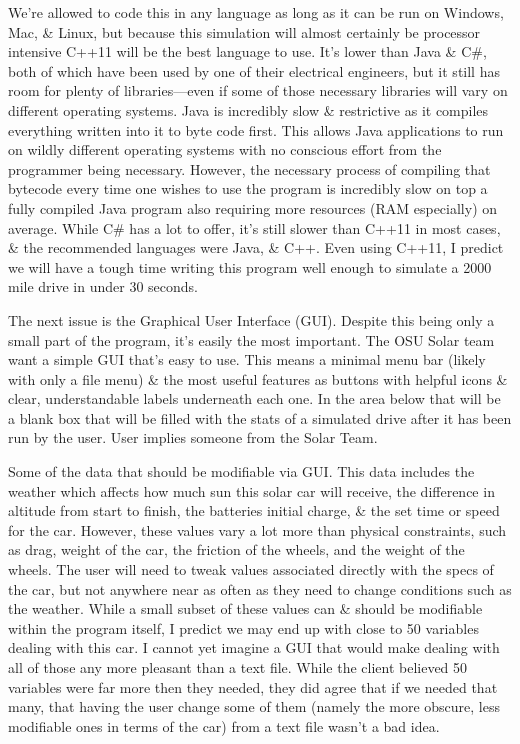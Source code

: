 \documentclass[onecolumn, draftclsnofoot,10pt, compsoc]{IEEEtran}
\begin{document}
\begin{singlespace}
We’re allowed to code this in any language as long as it can be run on Windows, Mac, \& Linux, but because this simulation will almost certainly be processor intensive C++11 will be the best language to use. It’s lower than Java \& C\#, both of which have been used by one of their electrical engineers, but it still has room for plenty of libraries—even if some of those necessary libraries will vary on different operating systems. Java is incredibly slow \& restrictive as it compiles everything written into it to byte code first. This allows Java applications to run on wildly different operating systems with no conscious effort from the programmer being necessary. However, the necessary process of compiling that bytecode every time one wishes to use the program is incredibly slow on top a fully compiled Java program also requiring more resources (RAM especially) on average. While C\# has a lot to offer, it’s still slower than C++11 in most cases, \& the recommended languages were Java, \& C++. Even using C++11, I predict we will have a tough time writing this program well enough to simulate a 2000 mile drive in under 30 seconds.

The next issue is the Graphical User Interface (GUI). Despite this being only a small part of the program, it’s easily the most important. The OSU Solar team want a simple GUI that’s easy to use. This means a minimal menu bar (likely with only a file menu) \& the most useful features as buttons with helpful icons \& clear, understandable labels underneath each one. In the area below that will be a blank box that will be filled with the stats of a simulated drive after it has been run by the user. User implies someone from the Solar Team.

Some of the data that should be modifiable via GUI. This data includes the weather which affects how much sun this solar car will receive, the difference in altitude from start to finish, the batteries initial charge, \& the set time or speed for the car. However, these values vary a lot more than physical constraints, such as drag, weight of the car, the friction of the wheels, and the weight of the wheels. The user will need to tweak values associated directly with the specs of the car, but not anywhere near as often as they need to change conditions such as the weather. While a small subset of these values can \& should be modifiable within the program itself, I predict we may end up with close to 50 variables dealing with this car. I cannot yet imagine a GUI that would make dealing with all of those any more pleasant than a text file. While the client believed 50 variables were far more then they needed, they did agree that if we needed that many, that having the user change some of them (namely the more obscure, less modifiable ones in terms of the car) from a text file wasn’t a bad idea.


\end{singlespace}
\end{document}
